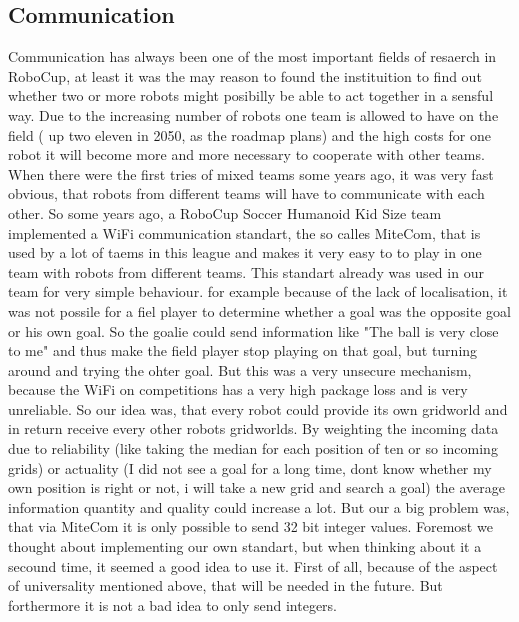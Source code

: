 \documentclass[lnicst,a4paper]{svmultln}
\begin{document}

\subsection{Communication}
Communication has always been one of the most important fields of resaerch in RoboCup, at least it was the may reason to found the instituition to find out whether two or more robots might posibilly be able to act together in a sensful way. 
Due to the increasing number of robots one team is allowed to have on the field ( up two eleven in 2050, as the roadmap plans) and the high costs for one robot it will become more and more necessary to cooperate with other teams. When there were the first tries of mixed teams some years ago, it was very fast obvious, that robots from different teams will have to communicate with each other.
So some years ago, a RoboCup Soccer Humanoid Kid Size team implemented a WiFi communication standart, the so calles MiteCom,  that is used by a lot of taems in this league and makes it very easy to to play in one team with robots from different teams.
This standart already was used in our team for very simple behaviour. for example because of the lack of localisation, it was not possile for a fiel player to determine whether a goal was the opposite goal or his own goal. So the goalie could send information like "The ball is very close to me" and thus make the field player stop playing on that goal, but turning around and trying the ohter goal. But this was a very unsecure mechanism, because the WiFi on competitions has a very high package loss and is very unreliable. 
So our idea was, that every robot could provide its own gridworld and in return receive every other robots gridworlds. By weighting the incoming data due to reliability (like taking the median for each position of ten or so incoming grids) or actuality (I did not see a goal for a long time, dont know whether my own position is right or not, i will take a new grid and search a goal) the average information quantity and quality could increase a lot.
But our a big problem was, that via MiteCom it is only possible to send 32 bit integer values. Foremost we thought about implementing our own standart, but when thinking about it a secound time, it seemed a good idea to use it. First of all, because of the aspect of universality mentioned above, that will be needed in the future. But forthermore it is not a bad idea to only send integers. 
\end{document}
